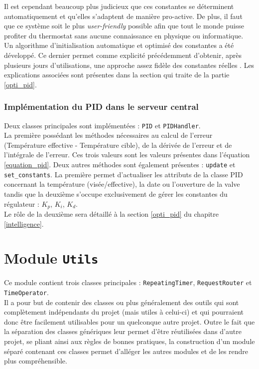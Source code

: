 \documentclass[11pt,a4paper,11pt]{report}
\begin{document}
Il est cependant beaucoup plus judicieux que ces constantes se déterminent automatiquement et qu'elles s'adaptent de manière pro-active. De plus, il faut que ce système soit le plus \textit{user-friendly} possible afin que tout le monde puisse profiter du thermostat sans aucune connaissance en physique ou informatique.\\

Un algorithme d'initialisation automatique et optimisé des constantes a été développé. Ce dernier permet comme explicité précédemment d'obtenir, après plusieurs jours d'utilisations, une approche assez fidèle des constantes \og réelles \fg. Les explications associées sont présentes dans la section qui traite de la partie \ref{opti_pid}.

\subsubsection{Implémentation du PID dans le serveur central}
\label{pid_section}

Deux classes principales sont implémentées : \texttt{PID} et \texttt{PIDHandler}. \\

La première possédant les méthodes nécessaires au calcul de l'erreur (Température effective - Température cible), de la dérivée de l'erreur et de l'intégrale de l'erreur. Ces trois valeurs sont les valeurs présentes dans l'équation \ref{equation_pid}. Deux autres méthodes sont également présentes : \texttt{update} et \texttt{set\_constants}. La première permet d'actualiser les attributs de la classe PID concernant la température (visée/effective), la date ou l'ouverture de la valve tandis que la deuxième s'occupe exclusivement de gérer les constantes du régulateur : $K_p$, $K_i$, $K_d$.\\

Le rôle de la deuxième sera détaillé à la section \ref{opti_pid} du chapitre \ref{intelligence}.\\

\section{Module \texttt{Utils}} %
\label{Utils}
Ce module contient trois classes principales : \texttt{RepeatingTimer}, \texttt{RequestRouter} et
\newline
\texttt{TimeOperator}. \\

Il a pour but de contenir des classes ou plus généralement des outils qui sont complètement indépendants du projet (mais utiles à celui-ci) et qui pourraient donc être facilement utilisables pour un quelconque autre projet. Outre le fait que la séparation des classes génériques leur permet d'être réutilisées dans d'autre projet, se pliant ainsi aux règles de bonnes pratiques, la construction d'un module séparé contenant ces classes permet d'alléger les autres modules et de les rendre plus compréhensible.\\
\end{document}
